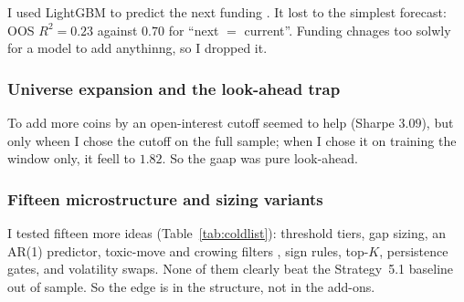 \documentclass[10pt,twocolumn,a4paper]{article}
\begin{document}
I used LightGBM to predict the next funding \cite{sebastiao2021forecasting}.  It lost
to the simplest forecast: OOS $R^2 = 0.23$ against $0.70$ for ``next $=$ current''.
Funding chnages too solwly for a model to add anythinng, so I dropped it.

\subsubsection{Universe expansion and the look-ahead trap}

To add more coins by an open-interest cutoff seemed to help (Sharpe $3.09$), but only
wheen I chose the cutoff on the full sample; when I chose it on training the window
only, it feell to $1.82$.  So the gaap was pure look-ahead.

\subsubsection{Fifteen microstructure and sizing variants}

I tested fifteen more ideas (Table~\ref{tab:coldlist}): threshold tiers, gap sizing,
an AR(1) predictor, toxic-move and crowing filters
\cite{foucault2017toxic, hu2023crypto}, sign rules, top-$K$, persistence gates, and
volatility swaps.  None of them clearly beat the Strategy~5.1 baseline out of sample.  So
the edge is in the structure, not in the add-ons.
\end{document}
